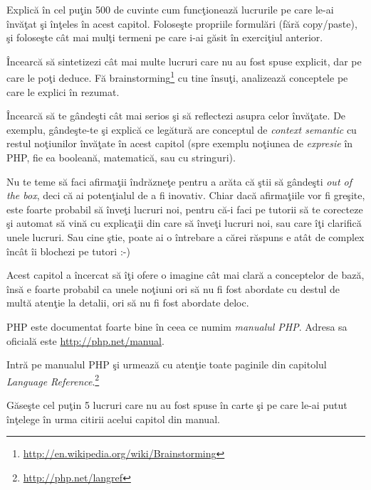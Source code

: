 \begin{Exercise}[title={Rezumat},difficulty=2]
Explică în cel puţin 500 de cuvinte cum funcţionează lucrurile pe care le-ai învăţat şi înţeles în acest
capitol. Foloseşte propriile formulări (fără copy/paste), şi foloseşte cât mai mulţi termeni
pe care i-ai găsit în exerciţiul anterior.

Încearcă să sintetizezi cât mai multe lucruri care nu au fost spuse explicit, dar pe care
le poţi deduce. Fă brainstorming\footnote{\url{http://en.wikipedia.org/wiki/Brainstorming}}
cu tine însuţi, analizează conceptele
pe care le explici în rezumat.

Încearcă să te gândeşti cât mai serios şi să reflectezi
asupra celor învăţate.
De exemplu, gândeşte-te şi explică ce legătură are conceptul de \textit{context semantic} cu
restul noţiunilor învăţate în acest capitol (spre exemplu noţiunea de \textit{expresie} în PHP,
fie ea booleană, matematică, sau cu stringuri).

Nu te teme să faci afirmaţii îndrăzneţe pentru a arăta că ştii să gândeşti \textit{out
of the box}, deci că ai potenţialul de a fi inovativ. Chiar dacă afirmaţiile vor
fi greşite, este foarte probabil să înveţi lucruri noi, pentru că-i faci 
pe tutorii {\phpro} să te corecteze şi automat să vină cu explicaţii din care
să înveţi lucruri noi, sau care îţi clarifică unele lucruri. Sau cine ştie,
poate ai o întrebare a cărei răspuns e atât de complex încât îi blochezi
pe tutori :-)
\end{Exercise}

\begin{Exercise}[title={Language Reference}]
Acest capitol a încercat să îţi ofere o imagine cât mai clară a conceptelor
de bază, însă e foarte probabil ca unele noţiuni ori să nu fi fost
abordate cu destul de multă atenţie la detalii, ori să nu fi fost abordate deloc.

PHP este documentat foarte bine în ceea ce numim \textit{manualul PHP}. Adresa
sa oficială este \url{http://php.net/manual}.

Intră pe manualul PHP şi urmează cu atenţie toate paginile din capitolul
\textit{Language Reference}.\footnote{\url{http://php.net/langref}}


Găseşte cel puţin 5 lucruri care nu au fost spuse în carte şi pe
care le-ai putut înţelege în urma citirii acelui capitol din manual.
\end{Exercise}

